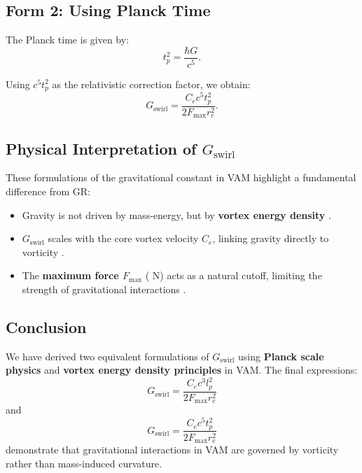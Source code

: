     \subsection*{Form 2: Using Planck Time}
    The Planck time is given by:
    \begin{equation*}
        t_p^2 = \frac{\hbar G}{c^5}.
    \end{equation*}

    Using \( c^5 t_p^2 \) as the relativistic correction factor, we obtain:
    \begin{equation*}
        G_\text{swirl} = \frac{C_e c^5 t_p^2}{2 F_{\max} r_c^2}.
    \end{equation*}

    \subsection*{Physical Interpretation of \(  G_\text{swirl} \)}
    These formulations of the gravitational constant in VAM highlight a fundamental difference from GR:
    \begin{itemize}
        \item Gravity is not driven by mass-energy, but by \textbf{vortex energy density} \cite{barcelo_superfluid}.
        \item \(  G_\text{swirl} \) scales with the core vortex velocity \( C_e \), linking gravity directly to vorticity \cite{moffatt_helicity}.
        \item The \textbf{maximum force \( F_{\max} \)} ( N) acts as a natural cutoff, limiting the strength of gravitational interactions \cite{schiller_max_force}.
    \end{itemize}

    \subsection*{Conclusion}
    We have derived two equivalent formulations of \(  G_\text{swirl} \) using \textbf{Planck scale physics} and \textbf{vortex energy density principles} in VAM. The final expressions:
    \begin{equation*}
        G_\text{swirl} = \frac{C_e c^3 l_p^2}{2 F_{\max} r_c^2}
    \end{equation*}
    and
    \begin{equation*}
        G_\text{swirl} = \frac{C_e c^5 t_p^2}{2 F_{\max} r_c^2}
    \end{equation*}
    demonstrate that gravitational interactions in VAM are governed by vorticity rather than mass-induced curvature.



